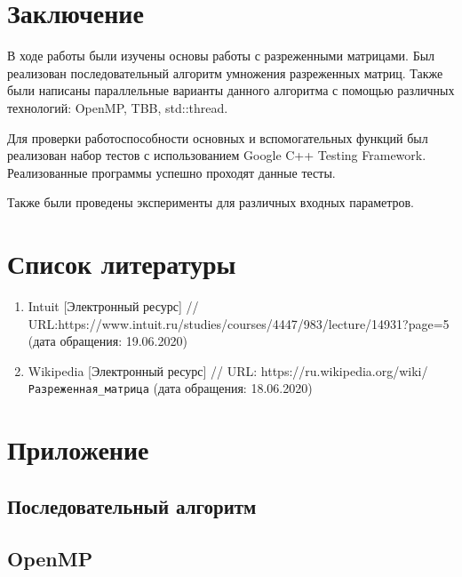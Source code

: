 \documentclass{report}
\begin{document}
\section*{Заключение}
В ходе работы были изучены основы работы с разреженными матрицами. Был реализован последовательный алгоритм умножения разреженных матриц. Также были написаны параллельные варианты данного алгоритма с помощью различных технологий: OpenMP, TBB, std::thread.
\par Для проверки работоспособности основных и вспомогательных функций был реализован набор тестов с использованием Google C++ Testing Framework. Реализованные программы успешно проходят данные тесты.
\par Также были проведены эксперименты для различных входных параметров.
\newpage



\section*{Список литературы}
\begin {enumerate}
\item Intuit [Электронный ресурс] // URL:https://www.intuit.ru/studies/courses/4447/983/lecture/14931?page=5 (дата обращения: 19.06.2020)
\item Wikipedia [Электронный ресурс] // URL: https://ru.wikipedia.org/wiki/\verb|Разреженная_матрица| (дата обращения: 18.06.2020)

\end{enumerate}
\newpage


\section*{Приложение}
\subsection{Последовательный алгоритм}




\subsection{OpenMP}



\end{document}
